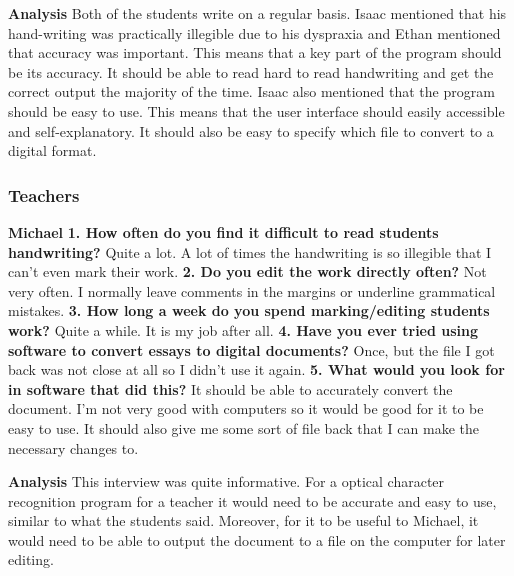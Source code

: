 \documentclass{report}
\begin{document}
\noindent\textbf{Analysis}
\newline
Both of the students write on a regular basis. Isaac mentioned that his hand-writing was practically illegible due to his dyspraxia and Ethan mentioned that accuracy was important. This means that a key part of the program should be its accuracy. It should be able to read hard to read handwriting and get the correct output the majority of the time.
\newline
Isaac also mentioned that the program should be easy to use. This means that the user interface should easily accessible and self-explanatory. It should also be easy to specify which file to convert to a digital format.
\newpage


\subsubsection{Teachers}

\textbf{Michael}
\newline
\textbf{1. How often do you find it difficult to read students handwriting?}
\newline
Quite a lot. A lot of times the handwriting is so illegible that I can't even mark their work.
\newline
\textbf{2. Do you edit the work directly often?}
\newline
Not very often. I normally leave comments in the margins or underline grammatical mistakes.
\newline
\textbf{3. How long a week do you spend marking/editing students work?}
\newline
Quite a while. It is my job after all.
\newline
\textbf{4. Have you ever tried using software to convert essays to digital documents?}
\newline
Once, but the file I got back was not close at all so I didn't use it again.
\newline
\textbf{5. What would you look for in software that did this?}
\newline
It should be able to accurately convert the document. I'm not very good with computers so it would be good for it to be easy to use. It should also give me some sort of file back that I can make the necessary changes to.
\newline

\noindent\textbf{Analysis}
\newline
This interview was quite informative. For a optical character recognition program  for a teacher it would need to be accurate and easy to use, similar to what the students said. Moreover, for it to be useful to Michael, it would need to be able to output the document to a file on the computer for later editing.
\end{document}
